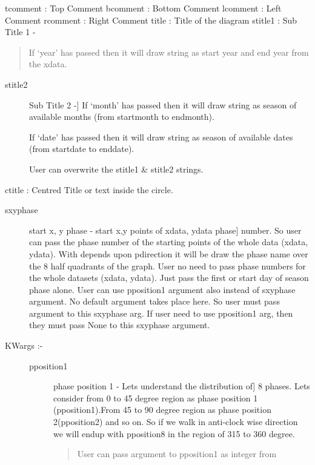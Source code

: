 \documentclass[letterpaper,10pt,english]{sphinxmanual}
\begin{document}
\begin{fulllineitems}
\begin{description}
\begin{description}
\end{description}

tcomment : Top Comment
bcomment : Bottom Comment
lcomment : Left Comment
rcomment : Right Comment
title : Title of the diagram
stitle1 : Sub Title 1 -
\begin{quote}

If `year' has passed then it will draw string as start year
and end year from the xdata.
\end{quote}
\begin{description}
\item[{stitle2}] \leavevmode{[}Sub Title 2 -{]}
If `month' has passed then it will draw string as season of
available months (from startmonth to endmonth).

If `date' has passed then it will draw string as season of
available dates (from startdate to enddate).

User can overwrite the stitle1 \& stitle2 strings.

\end{description}

ctitle : Centred Title or text inside the circle.
\begin{description}
\item[{sxyphase}] \leavevmode{[}start x, y phase - start x,y points of xdata, ydata phase{]}
number. So user can pass the phase number of the starting
points of the whole data (xdata, ydata). With depends upon
pdirection it will be draw the phase name over the 8
half quadrants of the graph. User no need to pass phase
numbers for the whole datasets (xdata, ydata). Just pass
the first or start day of season phase alone. User can use
pposition1 argument also instead of sxyphase argument.
No default argument takes place here. So user must pass
argument to this sxyphase arg. If user need to use
pposition1 arg, then they must pass None to this sxyphase
argument.

\item[{KWargs :-}] \leavevmode\begin{description}
\item[{pposition1}] \leavevmode{[}phase position 1 - Lets understand the distribution of{]}
8 phases. Lets consider from 0 to 45 degree region as
phase position 1 (pposition1).From 45 to 90 degree region
as phase position 2(pposition2) and so on. So if we walk
in anti-clock wise direction we will endup with pposition8
in the region of 315 to 360 degree.
\begin{quote}

User can pass argument to pposition1 as integer from
\end{quote}


\end{description}
\end{description}
\end{description}
\end{fulllineitems}
\end{document}
